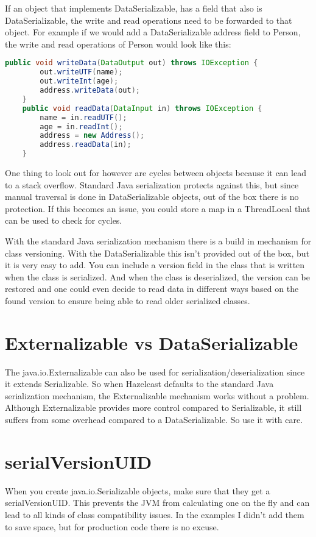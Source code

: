 If an object that implements DataSerializable, has a field that also is DataSerializable, the write and read operations need to be forwarded to that object. For example if we would add a DataSerializable address field to Person, the write and read operations of Person would look like this:
\begin{lstlisting}[language=java]
    public void writeData(DataOutput out) throws IOException {
        out.writeUTF(name);
        out.writeInt(age);
        address.writeData(out);
    }
    public void readData(DataInput in) throws IOException {
        name = in.readUTF();
        age = in.readInt();
        address = new Address();
        address.readData(in);
    }
\end{lstlisting}
One thing to look out for however are cycles between objects because it can lead to a stack overflow. Standard Java serialization protects against this, but since manual traversal is done in DataSerializable objects, out of the box there is no protection. If this becomes an issue, you could store a map in a ThreadLocal that can be used to check for cycles.

With the standard Java serialization mechanism there is a build in mechanism for class versioning. With the DataSerializable this isn't provided out of the box, but it is very easy to add. You can include a version field in the class that is written when the class is serialized. And when the class is deserialized, the version can be restored and one could even decide to read data in different ways based on the found version to ensure being able to read older serialized classes.

\section{Externalizable vs DataSerializable}
The java.io.Externalizable can also be used for serialization/deserialization since it extends Serializable. So when Hazelcast defaults to the standard Java serialization mechanism, the Externalizable mechanism works without a problem. Although Externalizable provides more control compared to Serializable, it still suffers from some overhead compared to a DataSerializable. So use it with care.

\section{serialVersionUID} 
When you create java.io.Serializable objects, make sure that they get a serialVersionUID. This prevents the JVM from calculating one on the fly and can lead to all kinds of class compatibility issues. In the examples I didn't add them to save space, but for production code there is no excuse.

